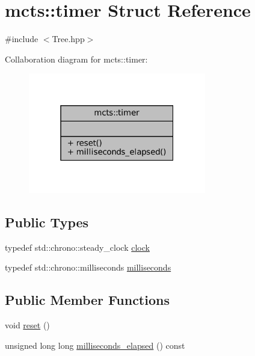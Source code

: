 \hypertarget{structmcts_1_1timer}{}\section{mcts\+:\+:timer Struct Reference}
\label{structmcts_1_1timer}


{\ttfamily \#include $<$Tree.\+hpp$>$}



Collaboration diagram for mcts\+:\+:timer\+:
\nopagebreak
\begin{figure}[H]
\begin{center}
\leavevmode
\includegraphics[width=220pt]{structmcts_1_1timer__coll__graph}
\end{center}
\end{figure}
\subsection*{Public Types}
\begin{DoxyCompactItemize}
\item 
typedef std\+::chrono\+::steady\+\_\+clock \hyperlink{structmcts_1_1timer_af23a84a48a3fefda5f4feab15335cdfa}{clock}
\item 
typedef std\+::chrono\+::milliseconds \hyperlink{structmcts_1_1timer_afb7f774a789b13dc7cadd5e064a1a247}{milliseconds}
\end{DoxyCompactItemize}
\subsection*{Public Member Functions}
\begin{DoxyCompactItemize}
\item 
void \hyperlink{structmcts_1_1timer_aebb46d1b1815b2d2bd17ae3acbf2b395}{reset} ()
\item 
unsigned long long \hyperlink{structmcts_1_1timer_af6b8b0201318b987bcab531de4b964f9}{milliseconds\+\_\+elapsed} () const
\end{DoxyCompactItemize}


